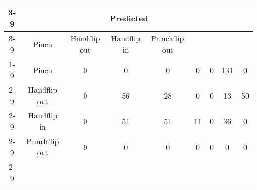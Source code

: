 \documentclass{standalone}
\begin{document}
 
 \begin{tabular}{|c |c |c |c |c |c |c |c |c |}
\cline{3-9}\multicolumn{2}{c|}{} & \multicolumn{7}{c|}{Predicted} \\ 
\cline{3-9} \multicolumn{2}{c |}{ } & Pinch & Handflip out & Handflip in & Punchflip out\\ 
\cline{1-9}\multirow{7}{*}{\rotatebox[origin=c]{90}{Actual}} & Pinch & 0 & 0 & 0 & 0 & 0 & 131 & 0\\ 
 \cline{2-9} & Handflip out & 0 & 56 & 28 & 0 & 0 & 13 & 50\\ 
 \cline{2-9} & Handflip in & 0 & 51 & 51 & 11 & 0 & 36 & 0\\ 
 \cline{2-9} & Punchflip out & 0 & 0 & 0 & 0 & 0 & 0 & 0\\ 
 \cline{2-9}\hline \end{tabular}
 
\end{document}
